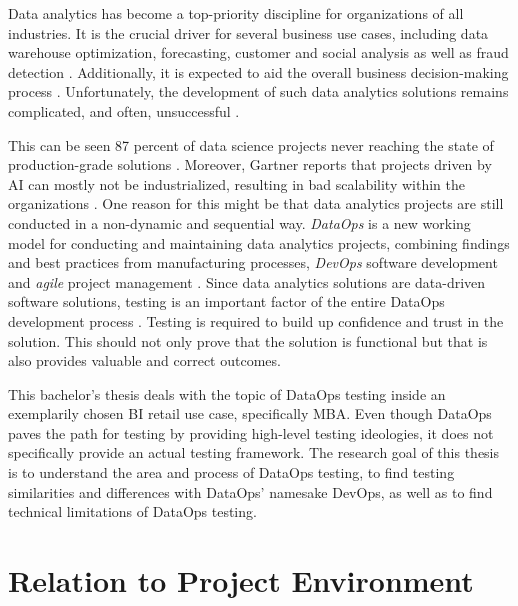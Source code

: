 
Data analytics has become a top-priority discipline for organizations of all industries. It is the crucial driver for several business use cases, including data warehouse optimization, forecasting, customer and social analysis as well as fraud detection \cite{Statista}. Additionally, it is expected to aid the overall business decision-making process \cite{Souibgui2019}. Unfortunately, the development of such data analytics solutions remains complicated, and often, unsuccessful \cite{DataKitchen2019}.

This can be seen 87 percent of data science projects never reaching the state of production-grade solutions \cite{VentureBeat}. Moreover, Gartner reports that projects driven by AI can mostly not be industrialized, resulting in bad scalability within the organizations \cite{White2019}. One reason for this might be that data analytics projects are still conducted in a non-dynamic and sequential way. \textit{DataOps} is a new working model for conducting and maintaining data analytics projects, combining findings and best practices from manufacturing processes, \textit{DevOps} software development and \textit{agile} project management \cite[17\psqq]{Bergh2019}. Since data analytics solutions are data-driven software solutions, testing is an important factor of the entire DataOps development process \cite[40\psqq]{Bergh2019}. Testing is required to build up confidence and trust in the solution. This should not only prove that the solution is functional but that is also provides valuable and correct outcomes.

This bachelor's thesis deals with the topic of DataOps testing inside an exemplarily chosen BI retail use case, specifically MBA. Even though DataOps paves the path for testing by providing high-level testing ideologies, it does not specifically provide an actual testing framework. The research goal of this thesis is to understand the area and process of DataOps testing, to find testing similarities and differences with DataOps' namesake DevOps, as well as to find technical limitations of DataOps testing.

\section{Relation to Project Environment}
	
	\label{sec:1-relation}
	
